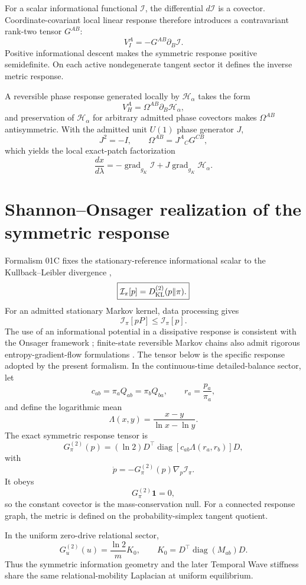 For a scalar informational functional \(\mathcal I\), the differential \(d\mathcal I\) is a covector. Coordinate-covariant local linear response therefore introduces a contravariant rank-two tensor \(G^{AB}\):
\[
V_I^A=-G^{AB}\partial_B\mathcal I.
\]
Positive informational descent makes the symmetric response positive semidefinite. On each active nondegenerate tangent sector it defines the inverse metric response.

A reversible phase response generated locally by \(\mathcal H_\alpha\) takes the form
\[
V_H^A=\Omega^{AB}\partial_B\mathcal H_\alpha,
\]
and preservation of \(\mathcal H_\alpha\) for arbitrary admitted phase covectors makes \(\Omega^{AB}\) antisymmetric. With the admitted unit \(U(1)\) phase generator \(J\),
\[
J^2=-I,
\qquad
\Omega^{AB}=J^A{}_{C}G^{CB},
\]
which yields the local exact-patch factorization
\[
\boxed{
\frac{dx}{d\lambda}
=-\operatorname{grad}_{g_K}\mathcal I
+J\operatorname{grad}_{g_K}\mathcal H_\alpha.
}
\]

\section{Shannon--Onsager realization of the symmetric response}
Formalism 01C fixes the stationary-reference informational scalar to the Kullback--Leibler divergence \cite{KullbackLeibler1951},
\[
\boxed{
\mathcal I_\pi[p]=D_{\rm KL}^{(2)}(p\|\pi).
}
\]
For an admitted stationary Markov kernel, data processing gives
\[
\mathcal I_\pi[pP]\le\mathcal I_\pi[p].
\]
The use of an informational potential in a dissipative response is consistent with the Onsager framework \cite{Onsager1931}; finite-state reversible Markov chains also admit rigorous entropy-gradient-flow formulations \cite{Maas2011}. The tensor below is the specific response adopted by the present formalism. In the continuous-time detailed-balance sector, let
\[
c_{ab}=\pi_aQ_{ab}=\pi_bQ_{ba},
\qquad
r_a=\frac{p_a}{\pi_a},
\]
and define the logarithmic mean
\[
\Lambda(x,y)=\frac{x-y}{\ln x-\ln y}.
\]
The exact symmetric response tensor is
\[
\boxed{
G^{(2)}_\pi(p)
=(\ln2)D^\top
\operatorname{diag}[c_{ab}\Lambda(r_a,r_b)]D,
}
\]
with
\[
\boxed{
\dot p=-G^{(2)}_\pi(p)\nabla_p\mathcal I_\pi.
}
\]
It obeys
\[
G^{(2)}_\pi\mathbf1=0,
\]
so the constant covector is the mass-conservation null. For a connected response graph, the metric is defined on the probability-simplex tangent quotient.

In the uniform zero-drive relational sector,
\[
\boxed{
G^{(2)}_u(u)=\frac{\ln2}{m}K_0,
\qquad
K_0=D^\top\operatorname{diag}(M_{ab})D.
}
\]
Thus the symmetric information geometry and the later Temporal Wave stiffness share the same relational-mobility Laplacian at uniform equilibrium.

